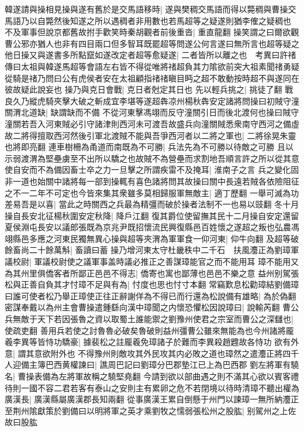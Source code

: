 韓遂請與操相見操與遂有舊於是交馬語移時|{
	遂與樊稠交馬語而得以斃稠與曹操交馬語乃以自斃然後知遂之所以遇稠者非用數也若馬超等之疑遂則猶李傕之疑稠也}
不及軍事但說京都舊故拊手歡笑時秦胡觀者前後重沓|{
	重直龍翻}
操笑謂之曰爾欲觀曹公邪亦猶人也非有四目兩口但多智耳既罷超等問遂公何言遂曰無所言也超等疑之他日操又與遂書多所點竄如遂改定者超等愈疑遂|{
	二者皆所以離之也　考異曰許禇傳曰太祖與韓遂馬超等會語左右皆不得從唯將禇超負其力隂欲前突大祖素聞禇勇疑從騎是禇乃問曰公有虎侯者安在太祖顧指禇禇瞋目眄之超不敢動按時超不與遂同在彼故疑此說妄也}
操乃與克日會戰|{
	克日者尅定其日也}
先以輕兵挑之|{
	挑徒了翻}
戰良久乃縱虎騎夾擊大破之斬成宜李堪等遂超犇凉州楊秋犇安定諸將問操曰初賊守潼關渭北道缺|{
	缺謂缺而不備}
不從河東擊馮翊而反守潼關引日而後北渡何也操曰賊守潼關若吾入河東賊必引守諸津則西河未可渡吾故盛兵向潼關賊悉衆南守西河之備虛故二將得擅取西河然後引軍北渡賊不能與吾爭西河者以二將之軍也|{
	二將徐晃朱靈也將即亮翻}
連車樹柵為甬道而南既為不可勝|{
	兵法先為不可勝以待敵之可勝}
且以示弱渡渭為堅壘虜至不出所以驕之也故賊不為營壘而求割地吾順言許之所以從其意使自安而不為備因畜士卒之力一旦擊之所謂疾雷不及掩耳|{
	淮南子之言}
兵之變化固非一道也始關中諸將每一部到操輒有喜色諸將問其故操曰關中長遠若賊各依險阻征之不一二年不可定也今皆來集其衆雖多莫相歸服軍無敵主|{
	適丁歷翻}
一舉可滅為功差易吾是以喜|{
	當此之時關西之兵最為精彊而破於操者法制不一也易以豉翻}
冬十月操自長安北征楊秋圍安定秋降|{
	降戶江翻}
復其爵位使留撫其民十二月操自安定還留夏侯淵屯長安以議郎張既為京兆尹既招懷流民興復縣邑百姓懷之遂超之叛也弘農馮翊縣邑多應之河東民獨無異心操與超等夾渭為軍軍食一仰河東|{
	仰牛向翻}
及超等破餘畜尚二十餘萬斛|{
	畜讀曰蓄}
操乃增河東太守杜畿秩中二千石　扶風灋正為劉璋軍議校尉|{
	軍議校尉使之議軍事盖時議必推正之善謀璋能官之而不能用耳}
璋不能用又為其州里俱僑客者所鄙正邑邑不得志|{
	僑寄也寓也鄙薄也邑邑不樂之意}
益州别駕張松與正善自負其才忖璋不足與有為|{
	忖度也思也忖寸本翻}
常竊歎息松勸璋結劉備璋曰誰可使者松乃舉正璋使正往正辭謝佯為不得已而行還為松說備有雄略|{
	為於偽翻}
密謀奉戴以為州主會曹操遣鍾繇向漢中璋聞之内懷恐懼松因說璋曰|{
	說輸芮翻}
曹公兵無敵于天下若因張魯之資以取蜀土誰能禦之劉豫州使君之宗室而曹公之深讎也|{
	使疏吏翻}
善用兵若使之討魯魯必破矣魯破則益州彊曹公雖來無能為也今州諸將龎羲李異等皆恃功驕豪|{
	據裴松之註龎羲免璋諸子於難而李異殺趙韙故各恃功}
欲有外意|{
	謂其意欲附外也}
不得豫州則敵攻其外民攻其内必敗之道也璋然之遣灋正將四千人迎備主簿巴西黄權諫曰|{
	譙周巴記曰劉璋分巴郡墊江已上為巴西郡}
劉左將軍有驍名|{
	曹操表備為左將軍故稱之驍堅堯翻}
今請到欲以部曲遇之則不滿其心欲以賓客禮待則一國不容二君若客有泰山之安則主有累卵之危不若閉境以待時清璋不聽出權為廣漢長|{
	廣漢縣屬廣漢郡長知兩翻}
從事廣漢王累自倒懸于州門以諫璋一無所納灋正至荆州隂獻策於劉備曰以明將軍之英才乘劉牧之懦弱張松州之股肱|{
	别駕州之上佐故曰股肱}
